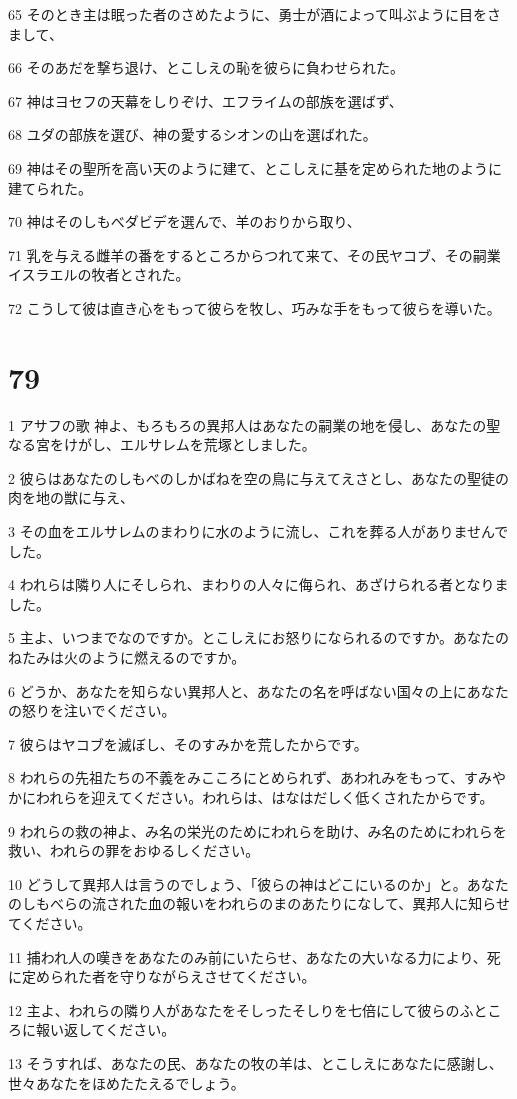 \par 65 そのとき主は眠った者のさめたように、勇士が酒によって叫ぶように目をさまして、
\par 66 そのあだを撃ち退け、とこしえの恥を彼らに負わせられた。
\par 67 神はヨセフの天幕をしりぞけ、エフライムの部族を選ばず、
\par 68 ユダの部族を選び、神の愛するシオンの山を選ばれた。
\par 69 神はその聖所を高い天のように建て、とこしえに基を定められた地のように建てられた。
\par 70 神はそのしもべダビデを選んで、羊のおりから取り、
\par 71 乳を与える雌羊の番をするところからつれて来て、その民ヤコブ、その嗣業イスラエルの牧者とされた。
\par 72 こうして彼は直き心をもって彼らを牧し、巧みな手をもって彼らを導いた。

\chapter{79}

\par 1 アサフの歌 神よ、もろもろの異邦人はあなたの嗣業の地を侵し、あなたの聖なる宮をけがし、エルサレムを荒塚としました。
\par 2 彼らはあなたのしもべのしかばねを空の鳥に与えてえさとし、あなたの聖徒の肉を地の獣に与え、
\par 3 その血をエルサレムのまわりに水のように流し、これを葬る人がありませんでした。
\par 4 われらは隣り人にそしられ、まわりの人々に侮られ、あざけられる者となりました。
\par 5 主よ、いつまでなのですか。とこしえにお怒りになられるのですか。あなたのねたみは火のように燃えるのですか。
\par 6 どうか、あなたを知らない異邦人と、あなたの名を呼ばない国々の上にあなたの怒りを注いでください。
\par 7 彼らはヤコブを滅ぼし、そのすみかを荒したからです。
\par 8 われらの先祖たちの不義をみこころにとめられず、あわれみをもって、すみやかにわれらを迎えてください。われらは、はなはだしく低くされたからです。
\par 9 われらの救の神よ、み名の栄光のためにわれらを助け、み名のためにわれらを救い、われらの罪をおゆるしください。
\par 10 どうして異邦人は言うのでしょう、「彼らの神はどこにいるのか」と。あなたのしもべらの流された血の報いをわれらのまのあたりになして、異邦人に知らせてください。
\par 11 捕われ人の嘆きをあなたのみ前にいたらせ、あなたの大いなる力により、死に定められた者を守りながらえさせてください。
\par 12 主よ、われらの隣り人があなたをそしったそしりを七倍にして彼らのふところに報い返してください。
\par 13 そうすれば、あなたの民、あなたの牧の羊は、とこしえにあなたに感謝し、世々あなたをほめたたえるでしょう。

